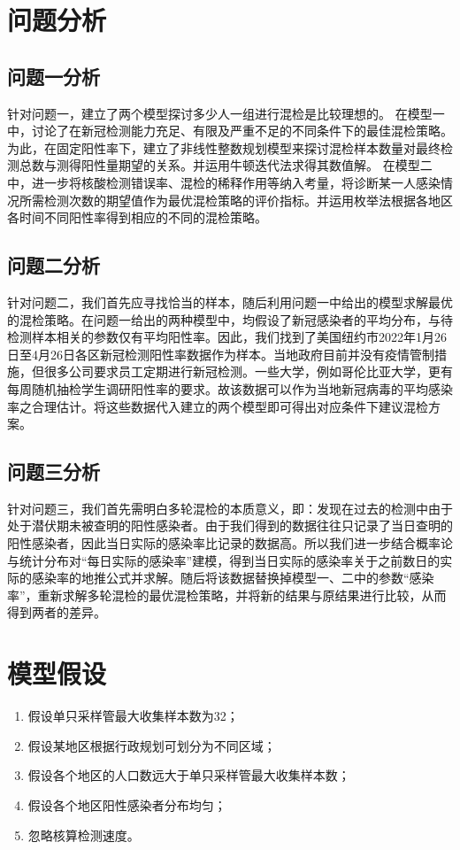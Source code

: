 \documentclass[withoutpreface,bwprint]{cumcmthesis} %
\begin{document}
\section{问题分析}
\subsection{问题一分析}
针对问题一，建立了两个模型探讨多少人一组进行混检是比较理想的。
在模型一中，讨论了在新冠检测能力充足、有限及严重不足的不同条件下的最佳混检策略。为此，在固定阳性率下，建立了非线性整数规划模型来探讨混检样本数量对最终检测总数与测得阳性量期望的关系。并运用牛顿迭代法求得其数值解。
在模型二中，进一步将核酸检测错误率、混检的稀释作用等纳入考量，将诊断某一人感染情况所需检测次数的期望值作为最优混检策略的评价指标。并运用枚举法根据各地区各时间不同阳性率得到相应的不同的混检策略。

\subsection{问题二分析}
针对问题二，我们首先应寻找恰当的样本，随后利用问题一中给出的模型求解最优的混检策略。在问题一给出的两种模型中，均假设了新冠感染者的平均分布，与待检测样本相关的参数仅有平均阳性率。因此，我们找到了美国纽约市2022年1月26日至4月26日各区新冠检测阳性率数据作为样本。当地政府目前并没有疫情管制措施，但很多公司要求员工定期进行新冠检测。一些大学，例如哥伦比亚大学，更有每周随机抽检学生调研阳性率的要求\cite{columbia}。故该数据可以作为当地新冠病毒的平均感染率之合理估计。将这些数据代入建立的两个模型即可得出对应条件下建议混检方案。

\subsection{问题三分析}%
针对问题三，我们首先需明白多轮混检的本质意义，即：发现在过去的检测中由于处于潜伏期未被查明的阳性感染者。由于我们得到的数据往往只记录了当日查明的阳性感染者，因此当日实际的感染率比记录的数据高。所以我们进一步结合概率论与统计分布对“每日实际的感染率”建模，得到当日实际的感染率关于之前数日的实际的感染率的地推公式并求解。随后将该数据替换掉模型一、二中的参数“感染率”，重新求解多轮混检的最优混检策略，并将新的结果与原结果进行比较，从而得到两者的差异。
\section{模型假设}
\begin{enumerate}
    \item 假设单只采样管最大收集样本数为32\cite{max_maps}；
    \item 假设某地区根据行政规划可划分为不同区域；
    \item 假设各个地区的人口数远大于单只采样管最大收集样本数；
    \item 假设各个地区阳性感染者分布均匀；
    \item 忽略核算检测速度。
\end{enumerate}
\end{document}
